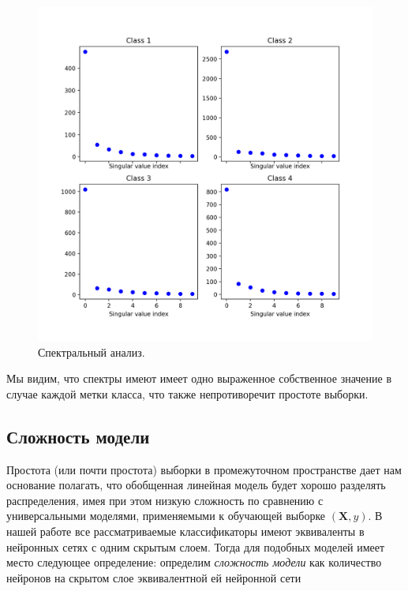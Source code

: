 \documentclass[12pt, fleqn, unicode]{article}
\newcommand{\bX}{\mathbf{X}}
\begin{document}
\begin{itemize}
    \begin{figure}[ht]
        \caption{Спектральный анализ.}
        \centering
          \includegraphics[width=\textwidth]{../pics/sv_analysis.png}
    \end{figure}

    Мы видим, что спектры имеют имеет одно выраженное собственное значение в случае
    каждой метки класса, что также непротиворечит простоте выборки.

\end{itemize}

\subsection{Сложность модели}

Простота (или почти простота) выборки в промежуточном пространстве дает нам основание
полагать, что обобщенная линейная модель будет хорошо разделять распределения,
имея при этом низкую сложность по сравнению с универсальными моделями, применяемыми
к обучающей выборке $(\bX, y)$. В нашей работе все рассматриваемые классификаторы
имеют эквиваленты в нейронных сетях с одним скрытым слоем. Тогда для
подобных моделей имеет место следующее определение: определим
\textit{сложность модели}
как количество нейронов на скрытом слое эквивалентной ей нейронной сети
\end{document}
